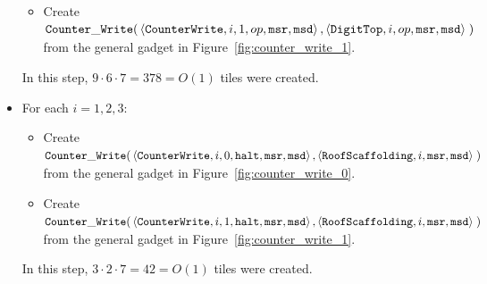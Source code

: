 \begin{itemize}
\begin{itemize}
        \item Create
        $\begin{aligned}[t]
            {\tt Counter\_Write}(& \left\langle {\tt CounterWrite}, i, 1, op, {\tt msr}, {\tt msd} \right\rangle,
                      \left\langle {\tt DigitTop},     i,    op, {\tt msr}, {\tt msd} \right\rangle \;)
        \end{aligned}$ \\ from the general gadget in Figure~\ref{fig:counter_write_1}.
    \end{itemize}

    In this step, $9 \cdot 6 \cdot 7 = 378 = O(1)$ tiles were created.

    \item For each $i = 1,2,3$:
    \begin{itemize}
        \item Create
        $\begin{aligned}[t]
            {\tt Counter\_Write}(& \left\langle {\tt CounterWrite},    i, 0, {\tt halt}, {\tt msr}, {\tt msd} \right\rangle,
                      \left\langle {\tt RoofScaffolding}, i,                {\tt msr}, {\tt msd} \right\rangle \;)
        \end{aligned}$ \\ from the general gadget in Figure~\ref{fig:counter_write_0}.

        \item Create
        $\begin{aligned}[t]
            {\tt Counter\_Write}(& \left\langle {\tt CounterWrite},    i, 1, {\tt halt}, {\tt msr}, {\tt msd} \right\rangle,
                      \left\langle {\tt RoofScaffolding}, i,                {\tt msr}, {\tt msd} \right\rangle \;)
        \end{aligned}$ \\ from the general gadget in Figure~\ref{fig:counter_write_1}.
    \end{itemize}
    In this step, $3 \cdot 2 \cdot 7 = 42 = O(1)$ tiles were created.
\end{itemize}

\vspace{.5cm}

